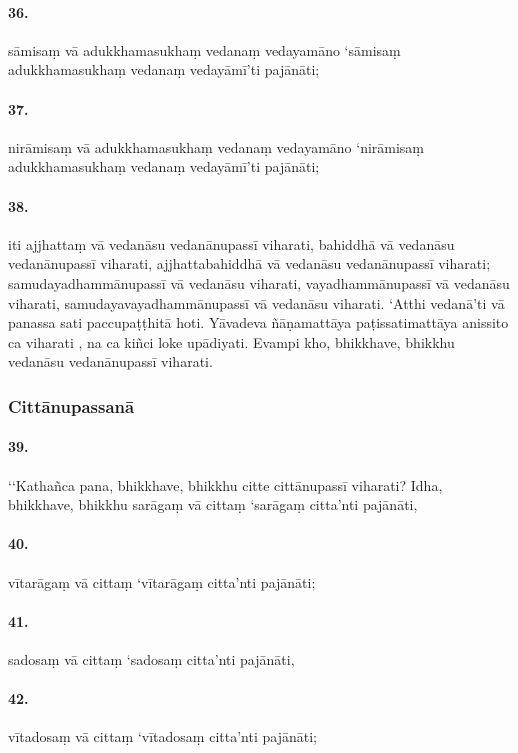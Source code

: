 \paragraph{36.} sāmisaṃ vā adukkhamasukhaṃ vedanaṃ vedayamāno ‘sāmisaṃ adukkhamasukhaṃ vedanaṃ vedayāmī’ti pajānāti;

\paragraph{37.} nirāmisaṃ vā adukkhamasukhaṃ vedanaṃ vedayamāno ‘nirāmisaṃ adukkhamasukhaṃ vedanaṃ vedayāmī’ti pajānāti;

\paragraph{38.} iti ajjhattaṃ vā vedanāsu vedanānupassī viharati, bahiddhā vā vedanāsu vedanānupassī viharati, ajjhattabahiddhā vā vedanāsu vedanānupassī viharati; samudayadhammānupassī vā vedanāsu viharati, vayadhammānupassī vā vedanāsu viharati, samudayavayadhammānupassī vā vedanāsu viharati. ‘Atthi vedanā’ti vā panassa sati paccupaṭṭhitā hoti. Yāvadeva ñāṇamattāya paṭissatimattāya anissito ca viharati , na ca kiñci loke upādiyati. Evampi kho, bhikkhave, bhikkhu vedanāsu vedanānupassī viharati.


\subsubsection{Cittānupassanā}

\paragraph{39.} ‘‘Kathañca pana, bhikkhave, bhikkhu citte cittānupassī viharati? Idha, bhikkhave, bhikkhu sarāgaṃ vā cittaṃ ‘sarāgaṃ citta’nti pajānāti,

\paragraph{40.} vītarāgaṃ vā cittaṃ ‘vītarāgaṃ citta’nti pajānāti;

\paragraph{41.} sadosaṃ vā cittaṃ ‘sadosaṃ citta’nti pajānāti,

\paragraph{42.} vītadosaṃ vā cittaṃ ‘vītadosaṃ citta’nti pajānāti;

